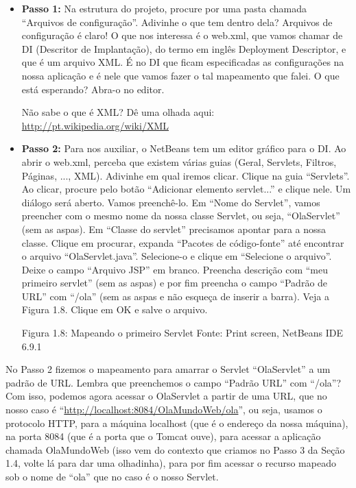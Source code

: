 \begin{itemize}

    \item \textbf{Passo 1:} Na estrutura do projeto, procure por uma pasta chamada ``Arquivos de configuração''. Adivinhe o que tem dentro dela? Arquivos de configuração é claro! O que nos interessa é o web.xml, que vamos chamar de DI (Descritor de Implantação), do termo em inglês Deployment Descriptor, e que é um arquivo XML. É no DI que ficam especificadas as configurações na nossa aplicação e é nele que vamos fazer o tal mapeamento que falei. O que está esperando? Abra-o no editor. 
    
    \begin{saibaMais}
        Não sabe o que é XML? Dê uma olhada aqui: \url{http://pt.wikipedia.org/wiki/XML}
    \end{saibaMais}
    
    \item \textbf{Passo 2:} Para nos auxiliar, o NetBeans tem um editor gráfico para o DI. Ao abrir o web.xml, perceba que existem várias guias (Geral, Servlets, Filtros, Páginas, ..., XML). Adivinhe em qual iremos clicar. Clique na guia ``Servlets''. Ao clicar, procure pelo botão ``Adicionar elemento servlet...'' e clique nele. Um diálogo será aberto. Vamos preenchê-lo. Em ``Nome do Servlet'', vamos preencher com o mesmo nome da nossa classe Servlet, ou seja, ``OlaServlet'' (sem as aspas). Em ``Classe do servlet'' precisamos apontar para a nossa classe. Clique em procurar, expanda ``Pacotes de código-fonte'' até encontrar o arquivo ``OlaServlet.java''. Selecione-o e clique em ``Selecione o arquivo''. Deixe o campo ``Arquivo JSP'' em branco. Preencha descrição com ``meu primeiro servlet'' (sem as aspas) e por fim preencha o campo ``Padrão de URL'' com ``/ola'' (sem as aspas e não esqueça de inserir a barra). Veja a Figura 1.8. Clique em OK e salve o arquivo.
    
    Figura 1.8: Mapeando o primeiro Servlet
    Fonte: Print screen, NetBeans IDE 6.9.1
    
\end{itemize}

No Passo 2 fizemos o mapeamento para amarrar o Servlet ``OlaServlet'' a um padrão de URL. Lembra que preenchemos o campo ``Padrão URL'' com ``/ola''? Com isso, podemos agora acessar o OlaServlet a partir de uma URL, que no nosso caso é ``\url{http://localhost:8084/OlaMundoWeb/ola}'', ou seja, usamos o protocolo HTTP, para a máquina localhost (que é o endereço da nossa máquina), na porta 8084 (que é a porta que o Tomcat ouve), para acessar a aplicação chamada OlaMundoWeb (isso vem do contexto que criamos no Passo 3 da Seção 1.4, volte lá para dar uma olhadinha), para por fim acessar o recurso mapeado sob o nome de ``ola'' que no caso é o nosso Servlet. 

